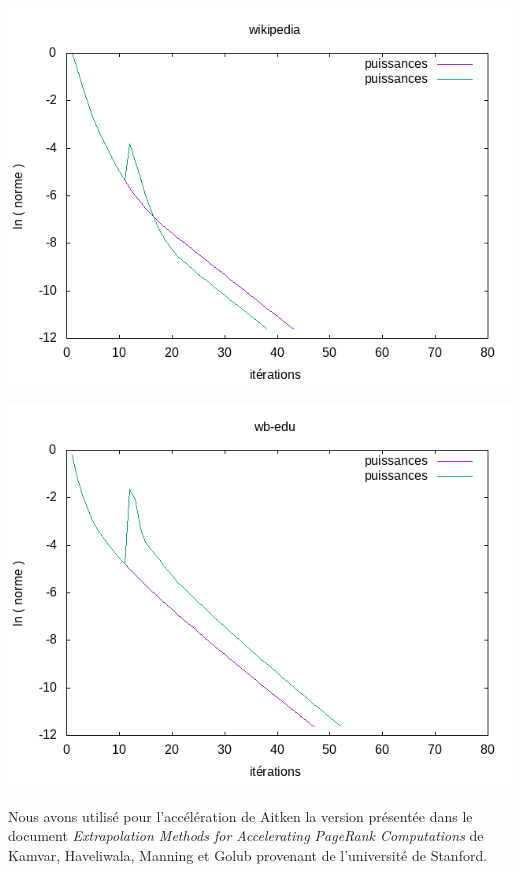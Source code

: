 		\begin{minipage}[c]{.46\linewidth}
			\begin{center}
				\includegraphics[scale=0.5]{plot-wikipedia.png}
			\end{center}
		\end{minipage} \hfill
		\begin{minipage}[c]{.46\linewidth}
			\begin{center}
				\includegraphics[scale=0.5]{plot-wb-edu.png}
			\end{center}
		\end{minipage}
		
		\paragraph{}Nous avons utilisé pour l'accélération de Aitken la version présentée dans le document \textit{Extrapolation Methods for Accelerating PageRank Computations} de Kamvar, Haveliwala, Manning et Golub provenant de l'université de Stanford.
